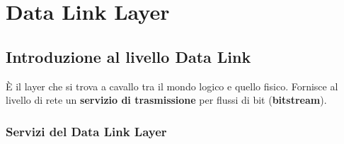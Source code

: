 \chapter{Data Link Layer}

\section{Introduzione al livello Data Link}

È il layer che si trova a cavallo tra il mondo logico e quello fisico. Fornisce al livello di rete un \textbf{servizio di trasmissione} per flussi di bit (\textbf{bitstream}).

\subsection{Servizi del Data Link Layer}
